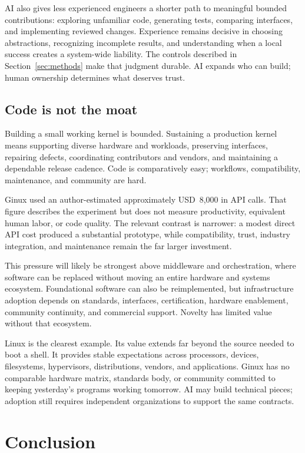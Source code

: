 \documentclass[11pt]{article}
\newcommand{\estimatedcost}{approximately USD~8,000}
\begin{document}
AI also gives less experienced engineers a shorter path to meaningful bounded
contributions: exploring unfamiliar code, generating tests, comparing
interfaces, and implementing reviewed changes. Experience remains decisive in
choosing abstractions, recognizing incomplete results, and understanding when a
local success creates a system-wide liability. The controls described in
Section~\ref{sec:methods} make that judgment durable. AI expands who can build;
human ownership determines what deserves trust.

\subsection{Code is not the moat}

Building a small working kernel is bounded. Sustaining a production kernel
means supporting diverse hardware and workloads, preserving interfaces,
repairing defects, coordinating contributors and vendors, and maintaining a
dependable release cadence. Code is comparatively easy; workflows,
compatibility, maintenance, and community are hard.

Ginux used an author-estimated \estimatedcost{} in API calls. That figure
describes the experiment but does not measure productivity, equivalent human
labor, or code quality. The relevant contrast is narrower: a modest direct API
cost produced a substantial prototype, while compatibility, trust, industry
integration, and maintenance remain the far larger investment.

This pressure will likely be strongest above middleware and orchestration,
where software can be replaced without moving an entire hardware and systems
ecosystem. Foundational software can also be reimplemented, but infrastructure
adoption depends on standards, interfaces, certification, hardware enablement,
community continuity, and commercial support. Novelty has limited value without
that ecosystem.

Linux is the clearest example. Its value extends far beyond the source needed
to boot a shell. It provides stable expectations across processors, devices,
filesystems, hypervisors, distributions, vendors, and applications. Ginux has
no comparable hardware matrix, standards body, or community committed to
keeping yesterday's programs working tomorrow. AI may build technical pieces;
adoption still requires independent organizations to support the same
contracts.

\section{Conclusion}
\end{document}
